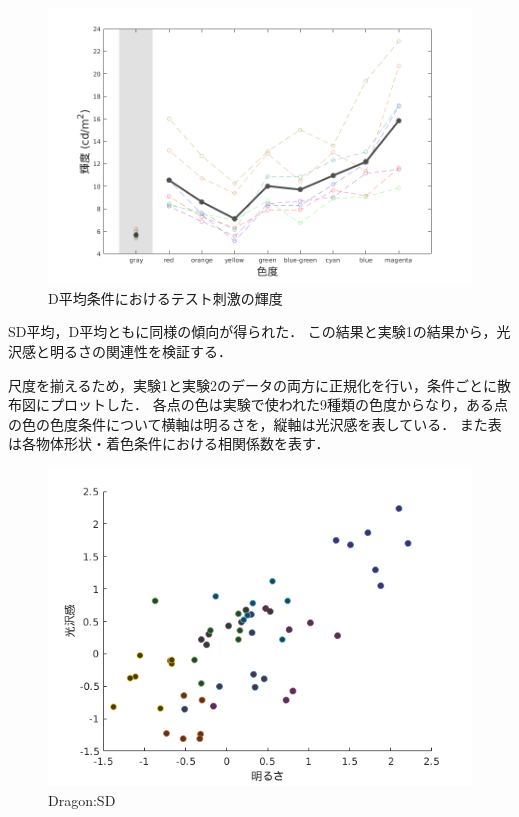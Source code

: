     \begin{figure}[h]
        \centering
        \includegraphics[width=14.0cm]{./img/ex2_res_SD_p.png}
        \caption{D平均条件におけるテスト刺激の輝度}
        \label{ex2_D}
    \end{figure}

    SD平均，D平均ともに同様の傾向が得られた．
    この結果と実験1の結果から，光沢感と明るさの関連性を検証する．

    尺度を揃えるため，実験1と実験2のデータの両方に正規化を行い，条件ごとに散布図にプロットした．
    各点の色は実験で使われた9種類の色度からなり，ある点の色の色度条件について横軸は明るさを，縦軸は光沢感を表している．
    また表は各物体形状・着色条件における相関係数を表す．

    \begin{figure}[h]
        \centering
        \includegraphics[width=12.0cm]{./img/ex3_DSD.png}
        \caption{Dragon:SD}
        \label{ex3_DSD}
    \end{figure}

